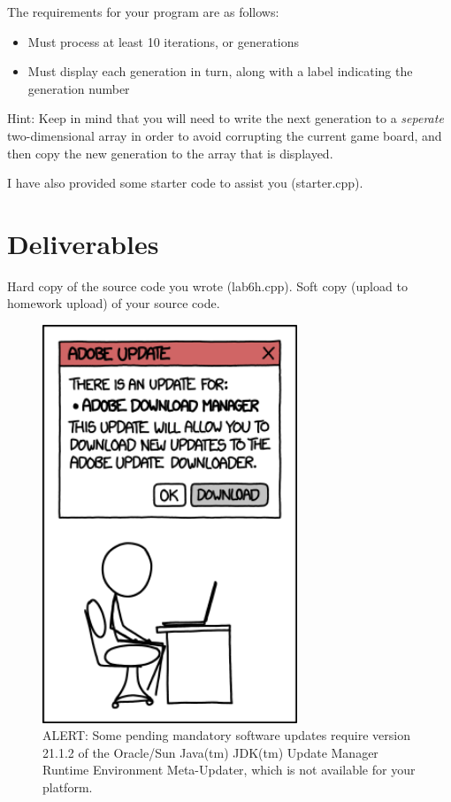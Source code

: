 \documentclass[letterpaper,12pt]{article}
\begin{document}
The requirements for your program are as follows:
\begin{itemize}
    \item Must process at least 10 iterations, or generations
    \item Must display each generation in turn, along with a label indicating the generation number
\end{itemize}

Hint: Keep in mind that you will need to write the next generation to a \emph{seperate} two-dimensional
array in order to avoid corrupting the current game board, and then copy the new generation to the array 
that is displayed.

I have also provided some starter code to assist you (starter.cpp).
\section*{Deliverables}
Hard copy of the source code you wrote (lab6h.cpp). Soft copy (upload to homework upload) of
your source code.

\begin{figure}[ht!]
	\centering
	\includegraphics[width=3in]{all_adobe_updates.png}
    \caption*{ALERT: Some pending mandatory software updates require version 21.1.2 of the Oracle/Sun Java(tm) JDK(tm) Update Manager Runtime Environment Meta-Updater, which is not available for your platform.}
\end{figure}
\end{document}
